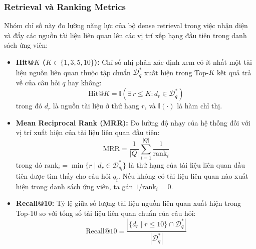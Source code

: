 \subsubsection{Retrieval và Ranking Metrics}
Nhóm chỉ số này đo lường năng lực của bộ dense retrieval trong việc nhận diện và đẩy các nguồn tài liệu liên quan lên các vị trí xếp hạng đầu tiên trong danh sách ứng viên:
\begin{itemize}
    \item \textbf{Hit@$K$ ($K \in \{1, 3, 5, 10\}$):} Chỉ số nhị phân xác định xem có ít nhất một tài liệu nguồn liên quan thuộc tập chuẩn $\mathcal{D}^*_q$ xuất hiện trong Top-$K$ kết quả trả về của câu hỏi $q$ hay không:
    \begin{equation}
    \text{Hit@}K = \mathbb{I}\left( \exists\, r \le K : d_r \in \mathcal{D}^*_q \right)
    \label{eq:hit_k}
    \end{equation}
    trong đó $d_r$ là nguồn tài liệu ở thứ hạng $r$, và $\mathbb{I}(\cdot)$ là hàm chỉ thị.

    \item \textbf{Mean Reciprocal Rank (MRR):} Đo lường độ nhạy của hệ thống đối với vị trí xuất hiện của tài liệu liên quan đầu tiên:
    \begin{equation}
    \text{MRR} = \frac{1}{|Q|} \sum_{i=1}^{|Q|} \frac{1}{\text{rank}_i}
    \label{eq:mrr}
    \end{equation}
    trong đó $\text{rank}_i = \min \{ r \mid d_r \in \mathcal{D}^*_{q_i} \}$ là thứ hạng của tài liệu liên quan đầu tiên được tìm thấy cho câu hỏi $q_i$. Nếu không có tài liệu liên quan nào xuất hiện trong danh sách ứng viên, ta gán $1/\text{rank}_i = 0$.

    \item \textbf{Recall@10:} Tỷ lệ giữa số lượng tài liệu nguồn liên quan xuất hiện trong Top-10 so với tổng số tài liệu liên quan chuẩn của câu hỏi:
    \begin{equation}
    \text{Recall@}10 = \frac{|\{ d_r \mid r \le 10 \} \cap \mathcal{D}^*_q|}{|\mathcal{D}^*_q|}
    \label{eq:recall_10}
    \end{equation}
\end{itemize}

